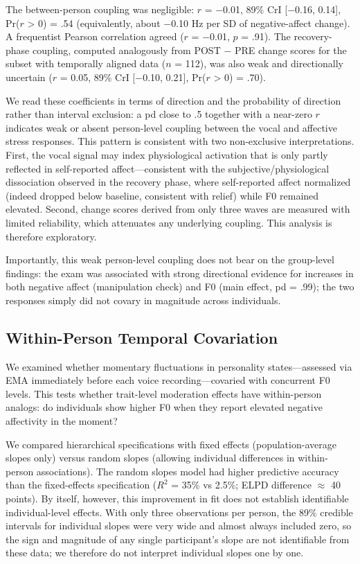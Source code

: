 \documentclass[
  english,
  man,floatsintext]{apa6}
\begin{document}
The between-person coupling was negligible: \(r\) = −0.01, 89\% CrI {[}−0.16, 0.14{]}, Pr(\(r\) \textgreater{} 0) = .54 (equivalently, about −0.10 Hz per SD of negative-affect change). A frequentist Pearson correlation agreed (\(r\) = −0.01, \(p\) = .91). The recovery-phase coupling, computed analogously from POST − PRE change scores for the subset with temporally aligned data (\(n\) = 112), was also weak and directionally uncertain (\(r\) = 0.05, 89\% CrI {[}−0.10, 0.21{]}, Pr(\(r\) \textgreater{} 0) = .70).

We read these coefficients in terms of direction and the probability of direction rather than interval exclusion: a pd close to .5 together with a near-zero \(r\) indicates weak or absent person-level coupling between the vocal and affective stress responses. This pattern is consistent with two non-exclusive interpretations. First, the vocal signal may index physiological activation that is only partly reflected in self-reported affect---consistent with the subjective/physiological dissociation observed in the recovery phase, where self-reported affect normalized (indeed dropped below baseline, consistent with relief) while F0 remained elevated. Second, change scores derived from only three waves are measured with limited reliability, which attenuates any underlying coupling. This analysis is therefore exploratory.

Importantly, this weak person-level coupling does not bear on the group-level findings: the exam was associated with strong directional evidence for increases in both negative affect (manipulation check) and F0 (main effect, pd = .99); the two responses simply did not covary in magnitude across individuals.

\subsection{Within-Person Temporal Covariation}\label{s-within-person-covariation}

We examined whether momentary fluctuations in personality states---assessed via EMA immediately before each voice recording---covaried with concurrent F0 levels. This tests whether trait-level moderation effects have within-person analogs: do individuals show higher F0 when they report elevated negative affectivity in the moment?

We compared hierarchical specifications with fixed effects (population-average slopes only) versus random slopes (allowing individual differences in within-person associations). The random slopes model had higher predictive accuracy than the fixed-effects specification (\(R^2\) = 35\% vs 2.5\%; ELPD difference \(\approx\) 40 points). By itself, however, this improvement in fit does not establish identifiable individual-level effects. With only three observations per person, the 89\% credible intervals for individual slopes were very wide and almost always included zero, so the sign and magnitude of any single participant's slope are not identifiable from these data; we therefore do not interpret individual slopes one by one.
\end{document}
